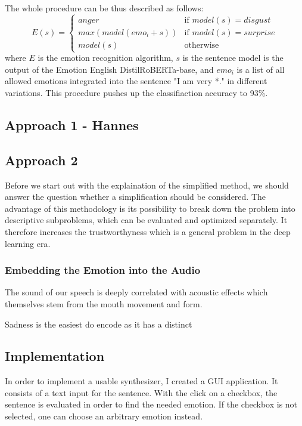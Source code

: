 \documentclass[11pt]{article}
\begin{document}
The whole procedure can be thus described as follows:
{
\small
\begin{equation*}
E(s)=\begin{cases}
  anger & \text{if } model(s)=disgust\\      
  max(model(emo_i+s)) & \text{if }  model(s)=surprise\\
  model(s) & \text{otherwise } 
\end{cases}
\end{equation*}
}
where $E$ is the emotion recognition algorithm, $s$ is the sentence model is the output of the Emotion English DistilRoBERTa-base, and $emo_i$ is a list of all allowed emotions integrated into the sentence "I am very *." in different variations.
This procedure pushes up the classifiaction accuracy to 93\%.

\subsection{Approach 1 - Hannes}
\subsection{Approach 2}

Before we start out with the explaination of the simplified method, we should answer the question whether a simplification should be considered. The advantage of this methodology is its possibility to break down the problem into descriptive subproblems, which can be evaluated and optimized separately. It therefore increases the trustworthyness which is a general problem in the deep learning era.


\subsubsection{Embedding the Emotion into the Audio}

The sound of our speech is deeply correlated with acoustic effects which themselves stem from the mouth movement and form\cite{arias_beyond_2020}. 



Sadness is the easiest do encode as it has a distinct


\subsection{Implementation}

In order to implement a usable synthesizer, I created a GUI application. It consists of a text input for the sentence. With the click on a checkbox, the sentence is evaluated in order to find the needed emotion. If the checkbox is not selected, one can choose an arbitrary emotion instead. 
\end{document}
